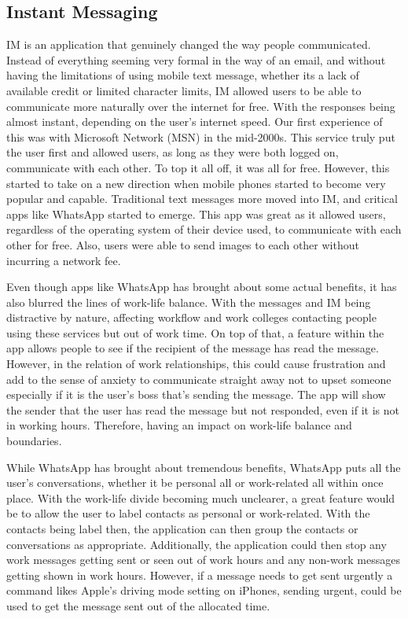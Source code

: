 \documentclass{sigchi}
\begin{document}
		\subsection{Instant Messaging}
		IM is an application that genuinely changed the way people communicated. Instead of everything seeming very formal in the way of an email, and without having the limitations of using mobile text message, whether its a lack of available credit or limited character limits, IM allowed users to be able to communicate more naturally over the internet for free. With the responses being almost instant, depending on the user's internet speed. Our first experience of this was with Microsoft Network (MSN) in the mid-2000s. This service truly put the user first and allowed users, as long as they were both logged on, communicate with each other. To top it all off, it was all for free. However, this started to take on a new direction when mobile phones started to become very popular and capable. Traditional text messages more moved into IM, and critical apps like WhatsApp started to emerge. This app was great as it allowed users, regardless of the operating system of their device used, to communicate with each other for free. Also, users were able to send images to each other without incurring a network fee.
		
		Even though apps like WhatsApp has brought about some actual benefits, it has also blurred the lines of work-life balance. With the messages and IM being distractive by nature, affecting workflow and work colleges contacting people using these services but out of work time. On top of that, a feature within the app allows people to see if the recipient of the message has read the message. However, in the relation of work relationships, this could cause frustration and add to the sense of anxiety to communicate straight away not to upset someone especially if it is the user's boss that's sending the message. The app will show the sender that the user has read the message but not responded, even if it is not in working hours. Therefore, having an impact on work-life balance and boundaries.
		
		While WhatsApp has brought about tremendous benefits, WhatsApp puts all the user's conversations, whether it be personal all or work-related all within once place. With the work-life divide becoming much unclearer, a great feature would be to allow the user to label contacts as personal or work-related. With the contacts being label then, the application can then group the contacts or conversations as appropriate.  Additionally, the application could then stop any work messages getting sent or seen out of work hours and any non-work messages getting shown in work hours. However, if a message needs to get sent urgently a command likes Apple's driving mode setting on iPhones, sending urgent, could be used to get the message sent out of the allocated time.
	
\end{document}
